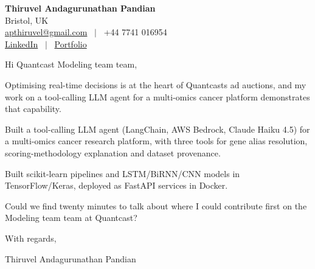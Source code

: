 \documentclass[11pt,a4paper]{article}
\begin{document}
\raggedright
\pagestyle{empty}

\begin{center}
    {\LARGE \color{linkblue} \textbf{Thiruvel Andagurunathan Pandian}}\\[0.2cm]
    Bristol, UK \\
    \href{mailto:apthiruvel@gmail.com}{apthiruvel@gmail.com} \ $|$ \ +44 7741 016954 \\
\href{https://www.linkedin.com/in/thiruvel-a-p/}{LinkedIn} \ $|$ \ \href{https://thiruvel-ap.github.io/PersonalPortfolio/}{Portfolio}
\end{center}

\vspace{0.4cm}

\noindent
Hi Quantcast Modeling team team,

Optimising real-time decisions is at the heart of Quantcast\textquotesingle{}s ad auctions, and my work on a tool-calling LLM agent for a multi-omics cancer platform demonstrates that capability.

Built a tool-calling LLM agent (LangChain, AWS Bedrock, Claude Haiku 4.5) for a multi-omics cancer research platform, with three tools for gene alias resolution, scoring-methodology explanation and dataset provenance.

Built scikit-learn pipelines and LSTM/BiRNN/CNN models in TensorFlow/Keras, deployed as FastAPI services in Docker.

Could we find twenty minutes to talk about where I could contribute first on the Modeling team team at Quantcast?

\vspace{0.5cm}

With regards,

Thiruvel Andagurunathan Pandian
\end{document}
